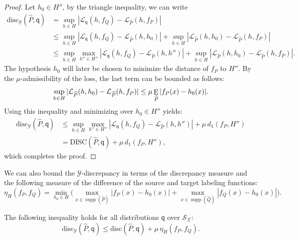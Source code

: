 \documentclass[twoside,11pt]{article}
\DeclareMathOperator*{\E}{\rm E}
\DeclareMathOperator{\supp}{supp}
\newcommand{\h}{\widehat}
\newcommand{\cL}{{\mathcal L}}
\newcommand{\cS}{{\mathcal S}}
\newcommand{\cX}{{\mathcal X}}
\newcommand{\cY}{{\mathcal Y}}
\newcommand{\1}{\mat{1}}
\newcommand{\qq}{{\mathsf q}}
\newcommand{\dis}{\mathrm{disc}}
\newcommand{\DIS}{\mathrm{DISC}}
\newcommand{\done}{d_1}
\begin{document}
\begin{proof}
Let $h_0 \in H''$, by the triangle inequality, we can write
\begin{align*}
  \dis_{\cY}(\h P, \qq)
& = \sup_{h \in H} | \cL_{\qq} (h, f_Q) -  \cL_{\h P }(h, f_P) | \\
& \leq \sup_{h \in H} | \cL_{\qq} (h, f_Q) - \cL_{\h P}(h, h_0)| +
\sup_{h \in H} |\cL_{\h P} (h, h_0) - \cL_{\h P} (h, f_P)| \\
& \leq \sup_{h \in H} \max_{h'' \in H''} |\cL_{\qq}(h, f_Q) - \cL_{\h
  P}(h, h'')| + \sup_{h \in H} |\cL_{\h P} (h, h_0) - \cL_{\h P} (h, f_P)|.
\end{align*}
The hypothesis $h_0$ will later be chosen to minimize the distance of
$f_P$ to $H''$. By the $\mu$-admissibility of the loss, the last term can be
bounded as follows:
\begin{equation*}
\sup_{h \in H} |\cL_{\h P} (h, h_0) - \cL_{\h P} (h, f_P)|
\leq \mu  \E_{\h P} | f_P(x) - h_0(x)|.
\end{equation*}
Using this inequality and minimizing over $h_0 \in H''$ yields:
\begin{align*}
 \dis_{\cY}(\h P, \qq)
& \leq \sup_{h \in H} \max_{h'' \in H''} | \cL_{\qq} (h, f_Q)
 - \cL_{\h P}(h, h'')| + \mu \, \done(f_P, H'')\\
& = \DIS(\h P, \qq) + \mu \, \done(f_P, H''),
\end{align*}
which completes the proof.
\end{proof}

We can also bound the $\cY$-discrepancy in terms of the discrepancy
measure and the following measure of the difference of the
source and target labeling functions:
\begin{equation*}
\eta_H(f_P, f_Q)  = \min_{h_0 \in H} \Big(\max_{x \in \supp(\h P)}
|f_P(x) - h_0(x)|  + \max_{x \in \supp(\h Q)} |f_Q(x) - h_0(x)| \Big).
\end{equation*}

\begin{proposition}
\label{prop:discbound}
The following inequality holds for all distributions $\qq$ over $\cS_\cX$:
\begin{equation*}
\dis_{\cY}(\h P, \qq) \leq \dis(\h P, \qq) + \mu \, \eta_H(f_P, f_Q).
\end{equation*}
\end{proposition}
\end{document}
